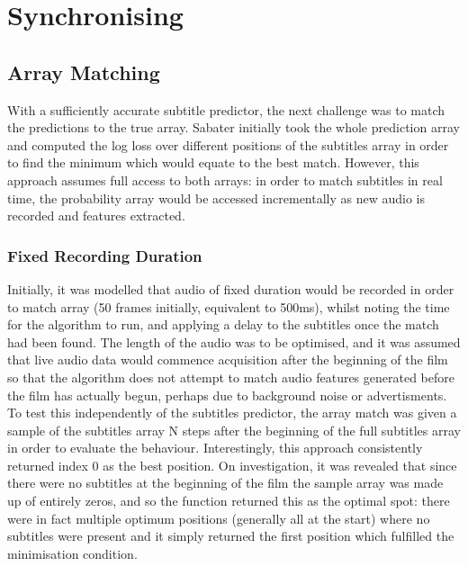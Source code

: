 
\chapter{Synchronising} %

\label{ChapterX} %


\section{Array Matching}
With a sufficiently accurate subtitle predictor, the next challenge was to match the predictions to the  true array. Sabater initially took the whole prediction array and computed the log loss over different positions of the subtitles array in order to find the minimum which would equate to the best match. However, this approach assumes full access to both arrays: in order to match subtitles in real time, the probability array would be accessed incrementally as new audio is recorded and features extracted. 

\subsection{Fixed Recording Duration}
Initially, it was modelled that audio of fixed duration would be recorded in order to match array (50 frames initially, equivalent to 500ms), whilst noting the time for the algorithm to run, and applying a delay to the subtitles once the match had been found. The length of the audio was to be optimised, and it was assumed that live audio data would commence acquisition after the beginning of the film so that the algorithm does not attempt to match audio features generated before the film has actually begun, perhaps due to background noise or advertisments. To test this independently of the subtitles predictor, the array match was given a sample of the subtitles array N steps after the beginning of the full subtitles array in order to evaluate the behaviour. Interestingly, this approach consistently returned index 0 as the best position. On investigation, it was revealed that since there were no subtitles at the beginning of the film the sample array was made up of entirely zeros, and so the function returned this as the optimal spot: there were in fact multiple optimum positions (generally all at the start) where no subtitles were present and it simply returned the first position which fulfilled the minimisation condition. 

